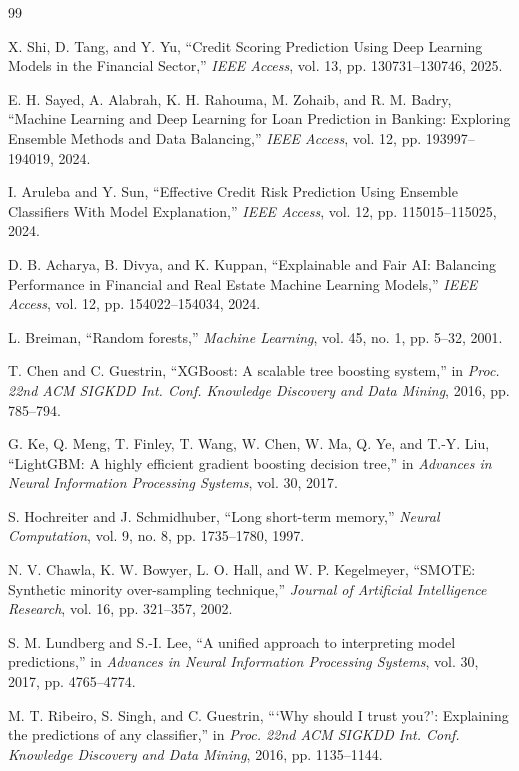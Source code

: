 \documentclass[12pt,a4paper,final]{extreport}
\begin{document}
\begingroup
{}
\begin{thebibliography}{99}

X. Shi, D. Tang, and Y. Yu, ``Credit Scoring Prediction Using Deep Learning Models in the Financial Sector,'' \textit{IEEE Access}, vol. 13, pp. 130731--130746, 2025.

E. H. Sayed, A. Alabrah, K. H. Rahouma, M. Zohaib, and R. M. Badry, ``Machine Learning and Deep Learning for Loan Prediction in Banking: Exploring Ensemble Methods and Data Balancing,'' \textit{IEEE Access}, vol. 12, pp. 193997--194019, 2024.

I. Aruleba and Y. Sun, ``Effective Credit Risk Prediction Using Ensemble Classifiers With Model Explanation,'' \textit{IEEE Access}, vol. 12, pp. 115015--115025, 2024.

D. B. Acharya, B. Divya, and K. Kuppan, ``Explainable and Fair AI: Balancing Performance in Financial and Real Estate Machine Learning Models,'' \textit{IEEE Access}, vol. 12, pp. 154022--154034, 2024.

L. Breiman, ``Random forests,'' \textit{Machine Learning}, vol. 45, no. 1, pp. 5--32, 2001.

T. Chen and C. Guestrin, ``XGBoost: A scalable tree boosting system,'' in \textit{Proc. 22nd ACM SIGKDD Int. Conf. Knowledge Discovery and Data Mining}, 2016, pp. 785--794.

G. Ke, Q. Meng, T. Finley, T. Wang, W. Chen, W. Ma, Q. Ye, and T.-Y. Liu, ``LightGBM: A highly efficient gradient boosting decision tree,'' in \textit{Advances in Neural Information Processing Systems}, vol. 30, 2017.

S. Hochreiter and J. Schmidhuber, ``Long short-term memory,'' \textit{Neural Computation}, vol. 9, no. 8, pp. 1735--1780, 1997.

N. V. Chawla, K. W. Bowyer, L. O. Hall, and W. P. Kegelmeyer, ``SMOTE: Synthetic minority over-sampling technique,'' \textit{Journal of Artificial Intelligence Research}, vol. 16, pp. 321--357, 2002.

S. M. Lundberg and S.-I. Lee, ``A unified approach to interpreting model predictions,'' in \textit{Advances in Neural Information Processing Systems}, vol. 30, 2017, pp. 4765--4774.

M. T. Ribeiro, S. Singh, and C. Guestrin, ```Why should I trust you?': Explaining the predictions of any classifier,'' in \textit{Proc. 22nd ACM SIGKDD Int. Conf. Knowledge Discovery and Data Mining}, 2016, pp. 1135--1144.

\end{thebibliography}
\endgroup
\end{document}
